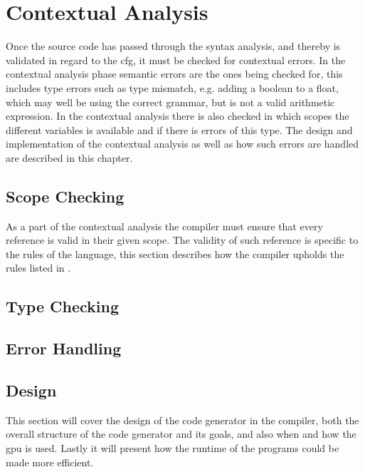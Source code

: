 


\chapter{Contextual Analysis}
Once the source code has passed through the syntax analysis, and thereby is validated in regard to the \acrshort{cfg}, it must be checked for contextual errors.
In the contextual analysis phase semantic errors are the ones being checked for, this includes type errors such as type mismatch, e.g. adding a boolean to a float, which may well be using the correct grammar, but is not a valid arithmetic expression.
In the contextual analysis there is also checked in which scopes the different variables is available and if there is errors of this type.
The design and implementation of the contextual analysis as well as how such errors are handled are described in this chapter.
%


\section{Scope Checking}
As a part of the contextual analysis the compiler must ensure that every reference is valid in their given scope.
The validity of such reference is specific to the rules of the language, this section describes how the compiler upholds the rules listed in .


\section{Type Checking}


\section{Error Handling}



\section{Design}
This section will cover the design of the code generator in the compiler, both the overall structure of the code generator and its goals, and also when and how the \acrshort{gpu} is used.
Lastly it will present how the runtime of the programs could be made more efficient.



